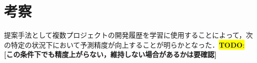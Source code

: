 \documentclass[T,J]{fose} %
\newcommand{\todo}[1]{\colorbox{yellow}{{\bf TODO}:}{\color{red} {\textbf{[#1]}}}}
\begin{document}



\section{考察}\label{sec:consideration}
提案手法として複数プロジェクトの開発履歴を学習に使用することによって，次の特定の状況下において予測精度が向上することが明らかとなった．\todo{この条件下でも精度上がらない，維持しない場合があるかは要確認}
\end{document}
